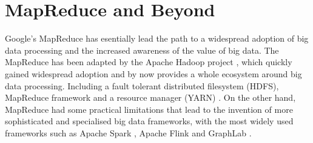 \section{MapReduce and Beyond}
Google's MapReduce has esentially lead the path to a widespread adoption of big data processing and the increased awareness of the value of big data. The MapReduce has been adapted by the Apache Hadoop project \cite{hadoop2009hadoop}, which quickly gained widespread adoption and by now provides a whole ecosystem around big data processing. 
Including a fault tolerant distributed filesystem (HDFS), MapReduce framework and a resource manager (YARN) \cite{KumarVavilapalli2013}. On the other hand, MapReduce had some practical limitations that lead to the invention of more sophisticated and specialised big data frameworks, with the most widely used frameworks such as Apache Spark \cite{Zaharia2010}, Apache Flink \cite{Alexandrov2014} and GraphLab \cite{Low2012}.

